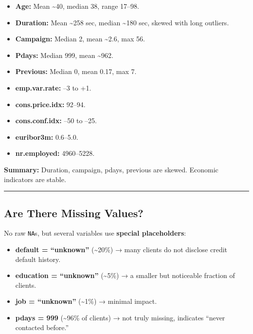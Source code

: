 \documentclass[
]{article}
\providecommand{\tightlist}{%
  \setlength{\itemsep}{0pt}\setlength{\parskip}{0pt}}
\begin{document}
\begin{itemize}
\tightlist
\item
  \textbf{Age:} Mean \textasciitilde40, median 38, range 17--98.\\
\item
  \textbf{Duration:} Mean \textasciitilde258 sec, median
  \textasciitilde180 sec, skewed with long outliers.\\
\item
  \textbf{Campaign:} Median 2, mean \textasciitilde2.6, max 56.\\
\item
  \textbf{Pdays:} Median 999, mean \textasciitilde962.\\
\item
  \textbf{Previous:} Median 0, mean 0.17, max 7.\\
\item
  \textbf{emp.var.rate:} --3 to +1.\\
\item
  \textbf{cons.price.idx:} 92--94.\\
\item
  \textbf{cons.conf.idx:} --50 to --25.\\
\item
  \textbf{euribor3m:} 0.6--5.0.\\
\item
  \textbf{nr.employed:} 4960--5228.
\end{itemize}

\textbf{Summary:} Duration, campaign, pdays, previous are skewed.
Economic indicators are stable.

\begin{center}\rule{0.5\linewidth}{0.5pt}\end{center}

\subsection{Are There Missing Values?}\label{are-there-missing-values-1}

No raw \texttt{NA}s, but several variables use \textbf{special
placeholders}:

\begin{itemize}
\tightlist
\item
  \textbf{default = ``unknown''} (\textasciitilde20\%) → many clients do
  not disclose credit default history.\\
\item
  \textbf{education = ``unknown''} (\textasciitilde5\%) → a smaller but
  noticeable fraction of clients.\\
\item
  \textbf{job = ``unknown''} (\textasciitilde1\%) → minimal impact.\\
\item
  \textbf{pdays = 999} (\textasciitilde96\% of clients) → not truly
  missing, indicates ``never contacted before.''
\end{itemize}
\end{document}
